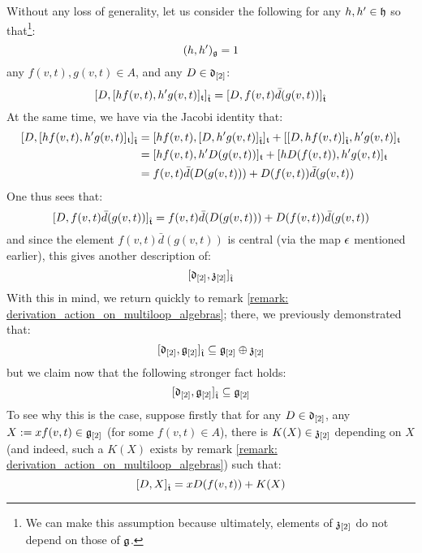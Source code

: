         \begin{remark} \label{remark: derivation_action_on_toroidal_centres}
            Without any loss of generality, let us consider the following for any $h, h' \in \mathfrak{h}$ so that\footnote{We can make this assumption because ultimately, elements of $\mathfrak{z}_{[2]}$ do not depend on those of $\mathfrak{g}$.}:
                $$(h, h')_{\mathfrak{g}} = 1$$
            any $f(v, t), g(v, t) \in A$, and any $D \in \mathfrak{d}_{[2]}$:
                $$[ D, [h f(v, t), h' g(v, t)]_{\mathfrak{t}} ]_{\hat{\mathfrak{t}}} = [ D, f(v, t) \bar{d}( g(v, t) ) ]_{\hat{\mathfrak{t}}}$$
            At the same time, we have via the Jacobi identity that:
                $$
                    \begin{aligned}
                        [ D, [h f(v, t), h' g(v, t)]_{\toroidal} ]_{\extendedtoroidal} & = [ h f(v, t), [D, h' g(v, t)]_{\extendedtoroidal} ]_{\toroidal} + [ [D, h f(v, t)]_{\extendedtoroidal}, h' g(v, t) ]_{\toroidal}
                        \\
                        & = [ h f(v, t), h' D( g(v, t) ) ]_{\toroidal} + [ h D( f(v, t) ), h' g(v, t) ]_{\toroidal}
                        \\
                        & = f(v, t) \bar{d}( D( g(v, t) ) ) + D( f(v, t) ) \bar{d}(g(v, t))
                    \end{aligned}
                $$
            One thus sees that:
                $$[ D, f(v, t) \bar{d}( g(v, t) ) ]_{\hat{\mathfrak{t}}} = f(v, t) \bar{d}( D( g(v, t) ) ) + D( f(v, t) ) \bar{d}(g(v, t))$$
            and since the element $f(v, t) \bar{d}( g(v, t) )$ is central (via the map $\epsilon$ mentioned earlier), this gives another description of:
                $$[ \mathfrak{d}_{[2]}, \mathfrak{z}_{[2]} ]_{\hat{\mathfrak{t}}}$$
            With this in mind, we return quickly to remark \ref{remark: derivation_action_on_multiloop_algebras}; there, we previously demonstrated that:
                $$[ \mathfrak{d}_{[2]}, \mathfrak{g}_{[2]} ]_{\hat{\mathfrak{t}}} \subseteq \mathfrak{g}_{[2]} \oplus \mathfrak{z}_{[2]}$$
            but we claim now that the following stronger fact holds:
                $$[ \mathfrak{d}_{[2]}, \mathfrak{g}_{[2]} ]_{\hat{\mathfrak{t}}} \subseteq \mathfrak{g}_{[2]}$$
            To see why this is the case, suppose firstly that for any $D \in \mathfrak{d}_{[2]}$, any $X := x f(v, t) \in \mathfrak{g}_{[2]}$ (for some $f(v, t) \in A$), there is $K(X) \in \mathfrak{z}_{[2]}$ depending on $X$ (and indeed, such a $K(X)$ exists by remark \ref{remark: derivation_action_on_multiloop_algebras}) such that:
                $$[ D, X ]_{\hat{\mathfrak{t}}} = x D( f(v, t) ) + K(X)$$

\end{remark}

